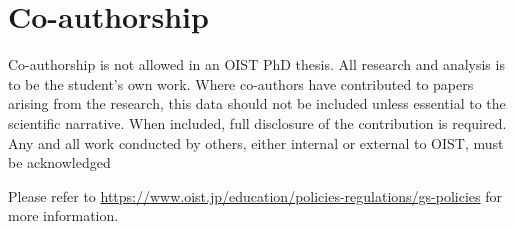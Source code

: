 \chapter*{Co-authorship}

Co-authorship is not allowed in an OIST PhD thesis.  All research and analysis is to be the student’s own work.  Where co-authors have contributed to papers arising from the research, this data should not be included unless essential to the scientific narrative.  When included, full disclosure of the contribution is required.  Any and all work conducted by others, either internal or external to OIST, must be acknowledged

Please refer to \url{https://www.oist.jp/education/policies-regulations/gs-policies} for more information.
